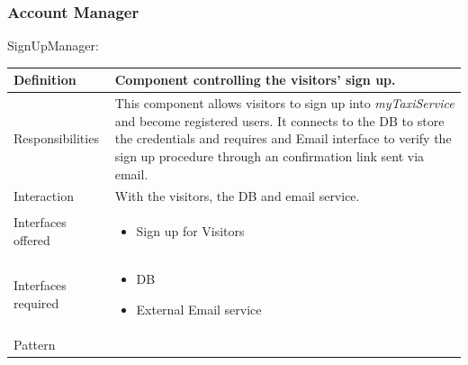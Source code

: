 \documentclass[a4paper,11pt]{report} %
\newcommand{\mts}{\mbox{\normalfont\itshape myTaxiService}}
\begin{document}
	\renewcommand{\arraystretch}{1.5}
	\setlength{\tabcolsep}{6pt}
	
		
	\subsubsection{Account Manager}
	\begin{minipage}{\linewidth}
	\end{minipage} \linebreak
	\centerline{SignUpManager:}	
	\begin{center}
		\begin{tabular}{| l | p{9cm} |}\hline
			Definition & Component controlling the visitors' sign up.\\\hline
			Responsibilities & This component allows visitors to sign up into \mts{} and become registered users. It connects to the DB to store the credentials and requires and Email interface to verify the sign up procedure through an confirmation link sent via email.\\\hline
			Interaction & With the visitors, the DB and email service.\\\hline
			Interfaces offered & \begin{itemize}
				\item Sign up for Visitors
			\end{itemize}\\\hline
			Interfaces required & \begin{itemize}
				\item DB 
				\item External Email service
			\end{itemize}\\\hline
			Pattern & \\\hline
		\end{tabular}
	\end{center}
	
\end{document}
